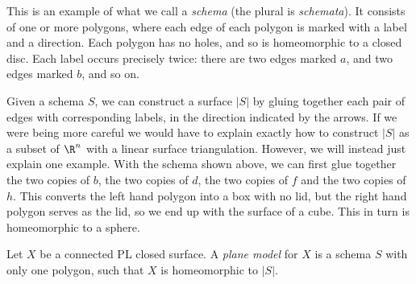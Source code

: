 This is an example of what we call a \emph{schema} (the plural is
\emph{schemata}).  It consists of one or more polygons, where each
edge of each polygon is marked with a label and a direction.  Each
polygon has no holes, and so is homeomorphic to a closed disc.  Each
label occurs precisely twice: there are two edges marked $a$, and two
edges marked $b$, and so on.

Given a schema $S$, we can construct a surface $|S|$ by gluing
together each pair of edges with corresponding labels, in the
direction indicated by the arrows.  If we were being more careful we
would have to explain exactly how to construct $|S|$ as a subset of
$\R^n$ with a linear surface triangulation.  However, we will instead
just explain one example.  With the schema shown above, we can first
glue together the two copies of $b$, the two copies of $d$, the two
copies of $f$ and the two copies of $h$.  This converts the left hand
polygon into a box with no lid, but the right hand polygon serves as
the lid, so we end up with the surface of a cube.  This in turn is
homeomorphic to a sphere.

\begin{definition}
 Let $X$ be a connected PL closed surface.  A \emph{plane model} for
 $X$ is a schema $S$ with only one polygon, such that $X$ is
 homeomorphic to $|S|$.
\end{definition}

